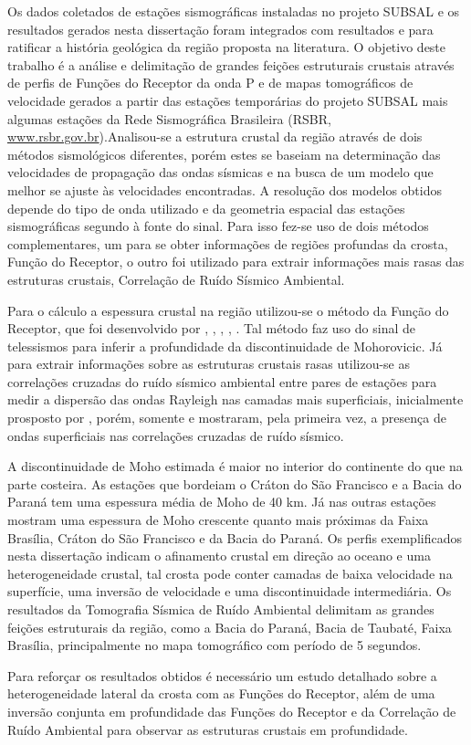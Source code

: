 Os dados coletados de estações sismográficas instaladas no projeto SUBSAL e os resultados gerados nesta dissertação foram integrados com resultados \cite{flora_solon_ancient_2013} e \cite{Silva_2014} para ratificar a história geológica da região proposta na literatura. O objetivo deste trabalho é a análise e delimitação de grandes feições estruturais crustais através de perfis de Funções do Receptor da onda P e de mapas tomográficos de velocidade gerados a partir das estações temporárias do projeto SUBSAL mais algumas estações da Rede Sismográfica Brasileira (RSBR, \url{www.rsbr.gov.br}).Analisou-se a estrutura crustal da região através de dois métodos sismológicos diferentes, porém estes se baseiam na determinação das velocidades de propagação das ondas sísmicas e na busca de um modelo que melhor se ajuste às velocidades encontradas. A resolução dos modelos obtidos depende do tipo de onda utilizado e da geometria espacial das estações sismográficas segundo à fonte do sinal. Para isso fez-se uso de dois métodos complementares, um para se obter informações de regiões profundas da crosta, Função do Receptor, o outro foi utilizado para extrair informações mais rasas das estruturas crustais, Correlação de Ruído Sísmico Ambiental.

Para o cálculo a espessura crustal na região utilizou-se o método da Função do Receptor, que foi desenvolvido por \cite{clayton_source_1976}, \cite{Langston_1977}, \cite{ammon_isolation_1991}, \cite{cassidy_numerical_1992}, \cite{Zhu_Kanamori_2000}. Tal método faz uso do sinal de telessismos para inferir a profundidade da discontinuidade de Mohorovicic. Já para extrair informações sobre as estruturas crustais rasas utilizou-se as correlações cruzadas do ruído sísmico ambiental entre pares de estações para medir a dispersão das ondas Rayleigh nas camadas mais superficiais, inicialmente prosposto por \cite{aki_space_1957}, porém, somente \cite{campillo_long-range_2003}  e \cite{shapiro_emergence_2004} mostraram, pela primeira vez, a  presença de ondas superficiais nas correlações cruzadas de ruído sísmico.

A discontinuidade de Moho estimada é maior no interior do continente do que na parte costeira. As estações que bordeiam o Cráton do São Francisco e a Bacia do Paraná tem uma espessura média de Moho de 40 km. Já nas outras estações mostram uma espessura de Moho crescente quanto mais próximas da Faixa Brasília, Cráton do São Francisco e da Bacia do Paraná. Os perfis exemplificados nesta dissertação indicam o afinamento crustal em direção ao oceano e uma heterogeneidade crustal, tal crosta pode conter camadas de baixa velocidade na superfície, uma inversão de velocidade e uma discontinuidade intermediária. Os resultados da Tomografia Sísmica de Ruído Ambiental delimitam as grandes feições estruturais da região, como a Bacia do Paraná, Bacia de Taubaté, Faixa Brasília, principalmente no mapa tomográfico com período de 5 segundos.

Para reforçar os resultados obtidos é necessário um estudo detalhado sobre a heterogeneidade lateral da crosta com as Funções do Receptor, além de uma inversão conjunta em profundidade das Funções do Receptor e da Correlação de Ruído Ambiental para observar as estruturas crustais em profundidade.